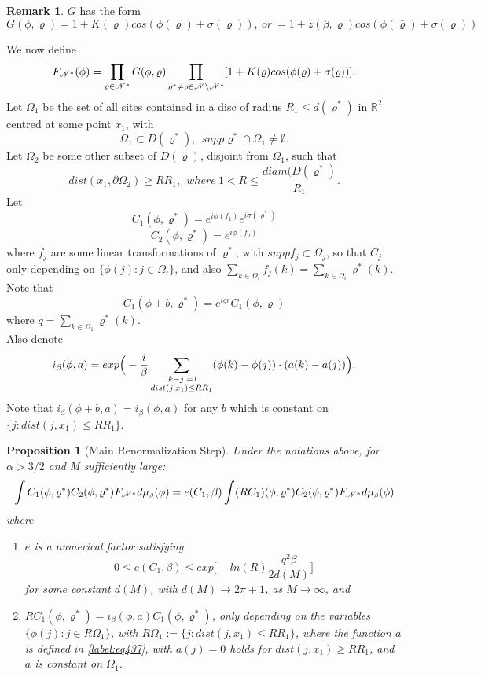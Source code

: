 \documentclass[11pt,reqno]{article}
\DeclarePairedDelimiter\abs{\lvert}{\rvert}%
\newtheorem{prop}[thm]{Proposition}
\theoremstyle{definition}
\newtheorem*{remark}{Remark}
\numberwithin{equation}{section}
\begin{document}
\begin{remark}
$G$ has the form 
$$G(\phi, \varrho) = 1+K(\varrho)cos(\phi(\varrho) + \sigma(\varrho)),\ or\ =1+z(\beta, \varrho)cos(\phi(\bar{\varrho}) + \sigma(\varrho))
$$
\end{remark}
We now define
$$
F_{\mathscr{N}^*}(\phi) = \prod_{\varrho \in \mathscr{N}^*} G(\phi, \varrho)
\prod_{\varrho^* \neq \varrho \in \mathscr{N} \setminus \mathscr{N}^*}[1+K(\varrho)cos(\phi(\varrho) + \sigma(\varrho))].
$$
Let $\Omega_1$ be the set of all sites contained in a disc of radius $R_1 \leq d(\varrho^*)$ in $\mathbb{R}^2$ centred at some point $x_1$, with
$$
\Omega_1 \subset D(\varrho^*), \ \ supp\varrho^* \cap \Omega_1 \neq \emptyset.
$$
Let $\Omega_2$ be some other subset of $D(\varrho)$, disjoint from $\Omega_1$, such that
$$
dist(x_1, \partial\Omega_2) \geq RR_1, \ \ where \ 1 < R \leq \frac{diam(D(\varrho^*)}{R_1} .
$$ 
Let 
$$
C_1(\phi, \varrho^*) = e^{i\phi(f_1)} e^{i\sigma(\varrho^*)}
$$ 
$$
C_2(\phi, \varrho^*) = e^{i\phi(f_2)}
$$ 
where $f_j$ are some linear transformations of $\varrho^*$, with $suppf_j \subset \Omega_j$, so that $C_j$ only depending on $\{ \phi(j): j \in \Omega_i \}$, and also $\sum_{k \in \Omega_i}f_j(k) = \sum_{k \in \Omega_i}\varrho^*(k)$. 
Note that 
$$
C_1(\phi+b, \varrho^*) = e^{iqr}C_1(\phi, \varrho)
$$ 
where $q = \sum_{k \in \Omega_1}\varrho^*(k)$.\\
Also denote 
$$
i_\beta(\phi, a) = exp\Big(-\frac{i}{\beta} \sum_{\substack{\abs{k-j}=1 \\ dist(j,x_1) \leq RR_1}} (\phi(k)-\phi(j)) \cdot (a(k)-a(j))\Big).
$$
Note that $i_\beta(\phi+b, a) = i_\beta(\phi, a)$ for any $b$ which is constant on $\{j: dist(j,x_1) \leq RR_1\} $.


\begin{prop}[Main Renormalization Step] \label{prop:prop44}
Under the notations above, for $\alpha > 3/2$ and M sufficiently large:
\begin{equation} \label{label:eq44}
\int C_1(\phi, \varrho^*) C_2(\phi, \varrho^*) F_{\mathscr{N}^*}d\mu_{\text{\tiny$\beta$}}(\phi) = 
e(C_1, \beta) \int (RC_1)(\phi, \varrho^*) C_2(\phi, \varrho^*) F_{\mathscr{N}^*}d\mu_{\text{\tiny$\beta$}}(\phi)
\end{equation}
where
\begin{enumerate}[label={\alph*)}]
\item $e$ is a numerical factor satisfying
$$
0 \leq e(C_1, \beta) \leq exp\Big[ -ln(R)\frac{q^2\beta}{2d(M)} \Big]
$$
for some constant $d(M)$, with $d(M) \rightarrow 2\pi+1$, as $M\rightarrow \infty$, and
\item $RC_1(\phi, \varrho^*) = i_\beta(\phi,a)C_1(\phi, \varrho^*)$, only depending on the variables $\{ \phi(j):j \in R\Omega_1 \}$, with $R\Omega_1 := \{ j: dist(j,x_1) \leq RR_1 \}$, where the function $a$ is defined in \eqref{label:eq437}, with $a(j)=0$ holds for $dist(j,x_1) \geq RR_1$, and $a$ is constant on $\Omega_1$.
\end{enumerate}
\end{prop}
\end{document}

